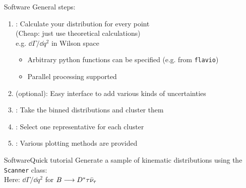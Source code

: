 \begin{frame}{Software}
    General steps:
    \begin{enumerate}
        \item {}: Calculate your distribution for every point\\ (Cheap: just use theoretical calculations)\\
        {\footnotesize e.g. $\dd\Gamma/\dd q^2$ in Wilson space}
        \begin{itemize}
            \item Arbitrary python functions can be specified (e.g. from \texttt{flavio})
            \item Parallel processing supported
        \end{itemize}
        \item {} (optional): Easy interface to add various kinds of uncertainties\\
        \item {}: Take the binned distributions and cluster them\\
        \item {}: Select one representative for each cluster
        \item {}: Various plotting methods are provided
    \end{enumerate}
\end{frame}

\begin{frame}[t, fragile]{Software}{Quick tutorial}
    Generate a sample of kinematic distributions using the \texttt{Scanner} class:\\
    {\footnotesize Here: $\dd\Gamma/\dd q^2$ for $B\longrightarrow D^*\tau\bar\nu_\tau$}
    

\end{frame}

